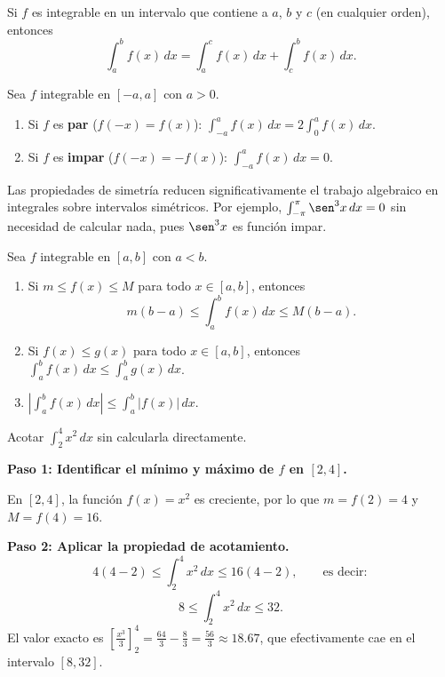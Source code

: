 \begin{theorem}
Si $f$ es integrable en un intervalo que contiene a $a$, $b$ y $c$ (en cualquier orden), entonces
\[
\int_{a}^{b} f(x)\,dx = \int_{a}^{c} f(x)\,dx + \int_{c}^{b} f(x)\,dx.
\]
\end{theorem}

\begin{theorem}
Sea $f$ integrable en $[-a, a]$ con $a > 0$.
\begin{enumerate}
    \item Si $f$ es \textbf{par} ($f(-x) = f(x)$): $\displaystyle\int_{-a}^{a} f(x)\,dx = 2\int_{0}^{a} f(x)\,dx$.
    \item Si $f$ es \textbf{impar} ($f(-x) = -f(x)$): $\displaystyle\int_{-a}^{a} f(x)\,dx = 0$.
\end{enumerate}
\end{theorem}

\begin{rem}
Las propiedades de simetría reducen significativamente el trabajo algebraico en integrales sobre intervalos simétricos. Por ejemplo, $\int_{-\pi}^{\pi}\sen^3 x\,dx = 0$ sin necesidad de calcular nada, pues $\sen^3 x$ es función impar.
\end{rem}

\begin{theorem}
Sea $f$ integrable en $[a,b]$ con $a < b$.
\begin{enumerate}
    \item Si $m \leq f(x) \leq M$ para todo $x\in[a,b]$, entonces
    \[
    m(b-a) \leq \int_{a}^{b} f(x)\,dx \leq M(b-a).
    \]
    \item Si $f(x) \leq g(x)$ para todo $x\in[a,b]$, entonces $\displaystyle\int_{a}^{b} f(x)\,dx \leq \int_{a}^{b} g(x)\,dx$.
    \item $\displaystyle\left|\int_{a}^{b} f(x)\,dx\right| \leq \int_{a}^{b} |f(x)|\,dx$.
\end{enumerate}
\end{theorem}

\begin{example}
Acotar $\displaystyle\int_{2}^{4} x^2\,dx$ sin calcularla directamente.

\begin{myproof}

\textbf{Paso 1: Identificar el mínimo y máximo de $f$ en $[2,4]$.}

En $[2,4]$, la función $f(x) = x^2$ es creciente, por lo que $m = f(2) = 4$ y $M = f(4) = 16$.

\textbf{Paso 2: Aplicar la propiedad de acotamiento.}
\[
4(4-2) \leq \int_{2}^{4} x^2\,dx \leq 16(4-2), \qquad \text{es decir}:
\]
\[
\boxed{8 \leq \int_{2}^{4} x^2\,dx \leq 32.}
\]
El valor exacto es $\left[\frac{x^3}{3}\right]_2^4 = \frac{64}{3} - \frac{8}{3} = \frac{56}{3} \approx 18.67$, que efectivamente cae en el intervalo $[8,32]$.
\end{myproof}
\end{example}

